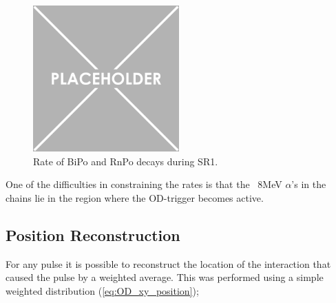 \begin{figure}
    \centering
    \includegraphics[width=0.5\textwidth]{Figures/Placeholder.png}
    \caption{Rate of BiPo and RnPo decays during SR1.}
    \label{fig:OD_BiPo_Rate}
\end{figure}

\par
One of the difficulties in constraining the rates is that the ~8MeV $\alpha$'s in the chains lie in the region where the OD-trigger becomes active.


\subsection{Position Reconstruction}
\par
For any pulse it is possible to reconstruct the location of the interaction that caused the pulse by a weighted average.
This was performed using a simple weighted distribution (\autoref{eq:OD_xy_position});

